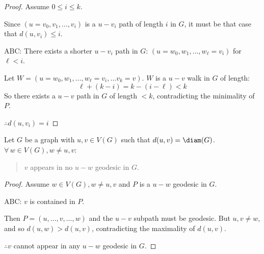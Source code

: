 \documentclass[letterpaper,12pt,fleqn]{article}
\begin{document}
\begin{proof}
  Assume \(0\le i\le k\).

  Since \((u=v_0,v_1,\ldots,v_i)\) is a \(u-v_i\) path of length \(i\) in \(G\), it must be that case that
  \(d(u,v_i)\le i\).

  ABC: There exists a shorter \(u-v_i\) path in \(G\): \((u=w_0,w_1,\ldots,w_{\ell}=v_i)\) for \(\ell<i\).

  Let \(W=(u=w_0,w_1,\ldots,w_{\ell}=v_i,\ldots v_k=v)\).  \(W\) is a \(u-v\) walk in \(G\) of length:
  \[\ell+(k-i)=k-(i-\ell)<k\]
  So there exists a \(u-v\) path in \(G\) of length \(<k\), contradicting the minimality of \(P\).

  \(\therefore d(u,v_i)=i\)
\end{proof}

\begin{theorem}
  Let \(G\) be a graph with \(u,v\in V(G)\) such that \(d(u,v)=\diam(G)\).  \(\forall\,w\in V(G),w\ne u,v\):
  \begin{quote}
    \(v\) appears in no \(u-w\) geodesic in \(G\).
  \end{quote}
\end{theorem}

\begin{proof}
  Assume \(w\in V(G),w\ne u,v\) and \(P\) is a \(u-w\) geodesic in \(G\).

  ABC: \(v\) is contained in \(P\).

  Then \(P=(u,\ldots,v,\ldots,w)\) and the \(u-v\) subpath must be geodesic.  But \(u,v\ne w\), and so
  \(d(u,w)>d(u,v)\), contradicting the maximality of \(d(u,v)\).

  \(\therefore v\) cannot appear in any \(u-w\) geodesic in \(G\).
\end{proof}
\end{document}
